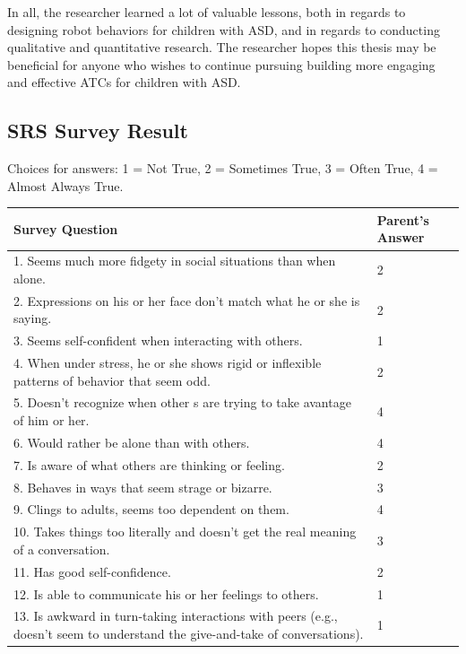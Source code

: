 \documentclass{ut-thesis}
\begin{document}
In all, the researcher learned a lot of valuable lessons, both in regards to designing robot behaviors for children with ASD, and in regards to conducting qualitative and quantitative research.  The researcher hopes this thesis may be beneficial for anyone who wishes to continue pursuing building more engaging and effective ATCs for children with ASD.
\begin{appendices}
\chapter{SRS Survey Result}
Choices for answers: 1 = Not True, 2 = Sometimes True, 3 = Often True, 4 = Almost Always True.
\begin{longtable}{ | p{13cm} | l | }
	\hline
	\textbf{Survey Question}	&	\textbf{Parent's Answer}	\\	\hline	\hline		
	1. Seems much more fidgety in social situations than when alone.	&	2	\\	\hline
	2. Expressions on his or her face don't match what he or she is saying.	&	2	\\	\hline
	3. Seems self-confident when interacting with others.	&	1	\\	\hline
	4. When under stress, he or she shows rigid or inflexible patterns of behavior that seem odd.	&	2	\\	\hline
	5. Doesn't recognize when other s are trying to take avantage of him or her.	&	4	\\	\hline
	6. Would rather be alone than with others.	&	4	\\	\hline
	7. Is aware of what others are thinking or feeling.	&	2	\\	\hline
	8. Behaves in ways that seem strage or bizarre.	&	3	\\	\hline
	9. Clings to adults, seems too dependent on them.	&	4	\\	\hline
	10. Takes things too literally and doesn't get the real meaning of a conversation.	&	3	\\	\hline
	11. Has good self-confidence.	&	2	\\	\hline
	12. Is able to communicate his or her feelings to others.	&	1	\\	\hline
	13. Is awkward in turn-taking interactions with peers (e.g., doesn't seem to understand the give-and-take of conversations).	&	1	\\	\hline

\end{longtable}
\end{appendices}
\end{document}
